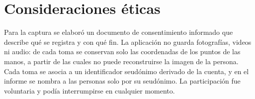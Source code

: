 \section{Consideraciones éticas}

Para la captura se elaboró un documento de consentimiento informado que describe qué se registra y con qué fin. La aplicación no guarda fotografías, videos ni audio: de cada toma se conservan solo las coordenadas de los puntos de las manos, a partir de las cuales no puede reconstruirse la imagen de la persona. Cada toma se asocia a un identificador seudónimo derivado de la cuenta, y en el informe se nombra a las personas solo por su seudónimo. La participación fue voluntaria y podía interrumpirse en cualquier momento.

